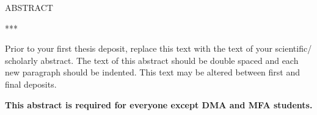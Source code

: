 \begin{doublespace}
\begin{tightcenter}
ABSTRACT
\mylinespacing
\end{tightcenter}
***

Prior to your first thesis deposit, replace this text with the text of your scientific/ scholarly abstract. The text of this abstract should be double spaced and each new paragraph should be indented. This text may be altered between first and final deposits.

\mylinespacing
\mylinespacing
\begin{tightcenter}
\textbf{This abstract is required for everyone except DMA and MFA students.}
\end{tightcenter}
\end{doublespace}
